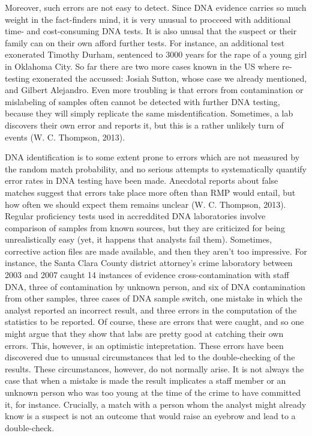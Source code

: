 \documentclass[
  10pt,
  dvipsnames,enabledeprecatedfontcommands]{scrartcl}
\begin{document}
Moreover, such errors are not easy to detect. Since DNA evidence carries
so much weight in the fact-finders mind, it is very unusual to procceed
with additional time- and cost-consuming DNA tests. It is also unusal
that the suspect or their family can on their own afford further tests.
For instance, an additional test exonerated Timothy Durham, sentenced to
3000 years for the rape of a young girl in Oklahoma City. So far there
are two more cases known in the US where re-testing exonerated the
accussed: Josiah Sutton, whose case we already mentioned, and Gilbert
Alejandro. Even more troubling is that errors from contamination or
mislabeling of samples often cannot be detected with further DNA
testing, because they will simply replicate the same misdentification.
Sometimes, a lab discovers their own error and reports it, but this is a
rather unlikely turn of events (W. C. Thompson, 2013).

DNA identification is to some extent prone to errors which are not
measured by the random match probability, and no serious attempts to
systematically quantify error rates in DNA testing have been made.
Anecdotal reports about false matches suggest that errors take place
more often than RMP would entail, but how often we should expect them
remains unclear (W. C. Thompson, 2013). Regular proficiency tests used
in accreddited DNA laboratories involve comparison of samples from known
sources, but they are criticized for being unrealistically easy (yet, it
happens that analysts fail them). Sometimes, corrective action files are
made available, and then they aren't too impressive. For instance, the
Santa Clara County district attorney's crime laboratory between 2003 and
2007 caught 14 instances of evidence cross-contamination with staff DNA,
three of contamination by unknown person, and six of DNA contamination
from other samples, three cases of DNA sample switch, one mistake in
which the analyst reported an incorrect result, and three errors in the
computation of the statistics to be reported. Of course, these are
errors that were caught, and so one might argue that they show that labs
are pretty good at catching their own errors. This, however, is an
optimistic intepretation. These errors have been discovered due to
unusual circumstances that led to the double-checking of the results.
These circumstances, however, do not normally arise. It is not always
the case that when a mistake is made the result implicates a staff
member or an unknown person who was too young at the time of the crime
to have committed it, for instance. Crucially, a match with a person
whom the analyst might already know is a suspect is not an outcome that
would raise an eyebrow and lead to a double-check.
\end{document}
